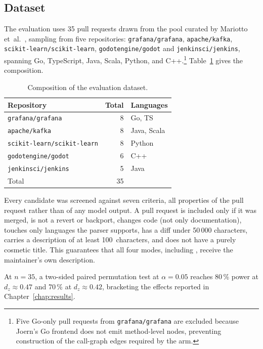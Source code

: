 \subsection{Dataset}
\label{sec:dataset}

The evaluation uses 35 pull requests drawn from the pool curated by
Mariotto et~al.~\cite{mariotto2025esem}, sampling from five repositories:
\texttt{grafana/grafana}, \texttt{apache/kafka},
\texttt{scikit-learn/scikit-learn}, \texttt{godotengine/godot} and
\texttt{jenkinsci/jenkins}, spanning Go, TypeScript, Java, Scala, Python, and
C++.\footnote{Five Go-only pull requests from \texttt{grafana/grafana} are
excluded because Joern's Go frontend does not emit method-level nodes,
preventing construction of the call-graph edges required by the \kg{} arm.}
Table~\ref{tab:dataset-composition} gives the composition.

\begin{table}[htbp]
    \centering
    \caption{Composition of the evaluation dataset.}
    \label{tab:dataset-composition}
    \begin{tabular}{lrl}
        \toprule
        Repository & Total & Languages \\
        \midrule
        \texttt{grafana/grafana}             &  8 & Go, TS \\
        \texttt{apache/kafka}                &  8 & Java, Scala \\
        \texttt{scikit-learn/scikit-learn}   &  8 & Python \\
        \texttt{godotengine/godot}           &  6 & C++ \\
        \texttt{jenkinsci/jenkins}           &  5 & Java \\
        \midrule
        Total                                & 35 & \\
        \bottomrule
    \end{tabular}
\end{table}

Every candidate was screened against seven criteria, all properties of the pull
request rather than of any model output. A pull request is included only if it
was merged, is not a revert or backport, changes code (not only documentation),
touches only languages the parser supports, has a diff under 50\,000 characters, carries a
description of at least 100~characters, and does not have a purely cosmetic
title. This guarantees that all four modes, including \baseline{}, receive the
maintainer's own description.

At $n=35$, a two-sided paired permutation test at $\alpha = 0.05$ reaches
80\,\% power at
$d_z \approx 0.47$ and 70\,\% at $d_z \approx 0.42$,
bracketing the effects reported in Chapter~\ref{chap:results}.

